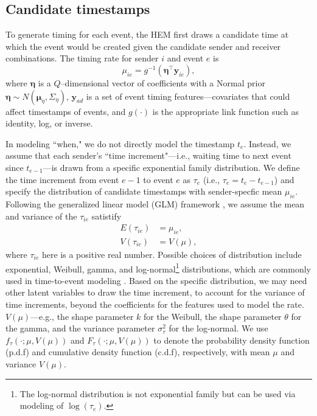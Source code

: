\documentclass[ba]{imsart}
\numberwithin{equation}{section}
\theoremstyle{plain}
\begin{document}
	\subsection{Candidate timestamps}\label{subsec:Time}
	To generate timing for each event, the HEM first draws a candidate time at which the event would be created given the candidate sender and receiver combinations. The timing rate for sender $i$ and event $e$ is
	\begin{equation}
		\mu_{ie} = g^{-1}(\boldsymbol{\eta}^\top \boldsymbol{y}_{ie}),
	\end{equation}
	where $\boldsymbol{\eta}$ is a $Q$--dimensional vector of coefficients with a Normal prior $\boldsymbol{\eta} \sim N(\boldsymbol{\mu}_\eta,\Sigma_\eta)$, $\boldsymbol{y}_{ad}$ is a set of event timing features---covariates that could affect timestamps of events, and $g(\cdot)$ is the appropriate link function such as identity, log, or inverse. 
	
	In modeling ``when," we do not directly model the timestamp $t_e$. Instead, we assume that each sender's ``time increment"---i.e., waiting time to next event since $t_{e-1}$---is drawn from a specific exponential family distribution. We define the time increment from event $e-1$ to event $e$ as $\tau_{e}$ (i.e., $\tau_{e}= t_e-t_{e-1}$) and specify the distribution of candidate timestamps with sender-specfic mean $\mu_{ie}$. Following the generalized linear model (GLM) framework \citep{nelder1972generalized}, we assume the mean and variance of the $\tau_{ie}$ satistify
	\begin{equation}
		\begin{aligned}
			E(\tau_{ie}) &= \mu_{ie},\\
			V(\tau_{ie}) &= V(\mu),
		\end{aligned}
	\end{equation}
	where $\tau_{ie}$ here is a positive real number. Possible choices of distribution include exponential, Weibull, gamma, and log-normal\footnote{The log-normal distribution is not exponential family but can be used via modeling of $\log(\tau_e)$.} distributions, which are commonly used in time-to-event modeling \citep{rao2000applied,rizopoulos2012joint}. Based on the specific distribution, we may need other latent variables to draw the time increment, to account for the variance of time increments, beyond the coefficients for the features used to model the rate. $V(\mu)$---e.g., the shape parameter $k$ for the Weibull, the shape parameter $\theta$ for the gamma, and the variance parameter $\sigma_\tau^2$ for the log-normal. We use $f_\tau(\cdot; \mu, V(\mu))$ and $F_\tau(\cdot; \mu, V(\mu))$ to denote the probability density function (p.d.f) and cumulative density function (c.d.f), respectively, with mean $\mu$ and variance $V(\mu)$.
\end{document}
